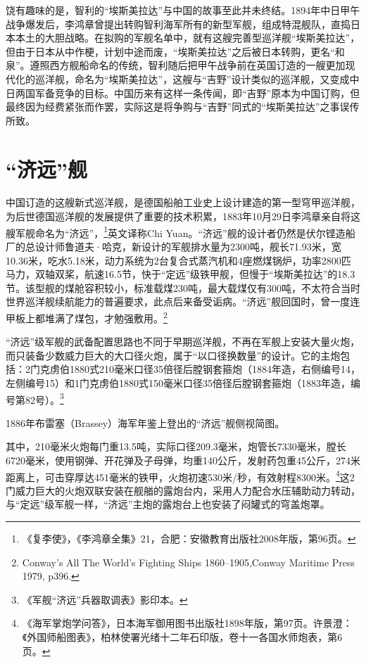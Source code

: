\documentclass[12pt,UTF8]{ctexbook}
\begin{document}
饶有趣味的是，智利的“埃斯美拉达”与中国的故事至此并未终结。1894年中日甲午战争爆发后，李鸿章曾提出转购智利海军所有的新型军舰，组成特混舰队，直捣日本本土的大胆战略。在拟购的军舰名单中，就有这艘完善型巡洋舰“埃斯美拉达”，但由于日本从中作梗，计划中途而废，“埃斯美拉达”之后被日本转购，更名“和泉”。遵照西方舰船命名的传统，智利随后把甲午战争前在英国订造的一艘更加现代化的巡洋舰，命名为“埃斯美拉达”，这艘与“吉野”设计类似的巡洋舰，又变成中日两国军备竞争的目标。中国历来有这样一条传闻，即“吉野”原本为中国订购，但最终因为经费紧张而作罢，实际这是将争购与“吉野”同式的“埃斯美拉达”之事误传所致。

\section{“济远”舰}

中国订造的这艘新式巡洋舰，是德国船舶工业史上设计建造的第一型穹甲巡洋舰，为后世德国巡洋舰的发展提供了重要的技术积累，1883年10月29日李鸿章亲自将这艘军舰命名为“济远”，\footnote{《复李使》，《李鸿章全集》21，合肥：安徽教育出版社2008年版，第96页。}英文译称Chi Yuan。“济远”舰的设计者仍然是伏尔铿造船厂的总设计师鲁道夫·哈克，新设计的军舰排水量为2300吨，舰长71.93米，宽10.36米，吃水5.18米，动力系统为2台复合式蒸汽机和4座燃煤锅炉，功率2800匹马力，双轴双桨，航速16.5节，快于“定远”级铁甲舰，但慢于“埃斯美拉达”的18.3节。该型舰的煤舱容积较小，标准载煤230吨，最大载煤仅有300吨，不太符合当时世界巡洋舰续航能力的普遍要求，此点后来备受诟病。“济远”舰回国时，曾一度连甲板上都堆满了煤包，才勉强敷用。\footnote{Conway's All The World's Fighting Ships 1860--1905,Conway Maritime Press 1979, p396.}

“济远”级军舰的武备配置思路也不同于早期巡洋舰，不再在军舰上安装大量火炮，而只装备少数威力巨大的大口径火炮，属于“以口径换数量”的设计。它的主炮包括：2门克虏伯1880式210毫米口径35倍径后膛钢套箍炮（1884年造，右侧编号14，左侧编号15）和1门克虏伯1880式150毫米口径35倍径后膛钢套箍炮（1883年造，编号第82号）。\footnote{《军舰“济远”兵器取调表》影印本。}

1886年布雷塞（Brassey）海军年鉴上登出的“济远”舰侧视简图。

其中，210毫米火炮每门重13.5吨，实际口径209.3毫米，炮管长7330毫米，膛长6720毫米，使用钢弹、开花弹及子母弹，均重140公斤，发射药包重45公斤，274米距离上，可击穿厚达451毫米的铁甲，火炮初速530米/秒，有效射程8300米。\footnote{《海军掌炮学问答》，日本海军御用图书出版社1898年版，第97页。许景澄：《外国师船图表》，柏林使署光绪十二年石印版，卷十一各国水师炮表，第6页。}这2门威力巨大的火炮双联安装在舰艏的露炮台内，采用人力配合水压辅助动力转动，与“定远”级军舰一样，“济远”主炮的露炮台上也安装了闷罐式的穹盖炮罩。
\end{document}
